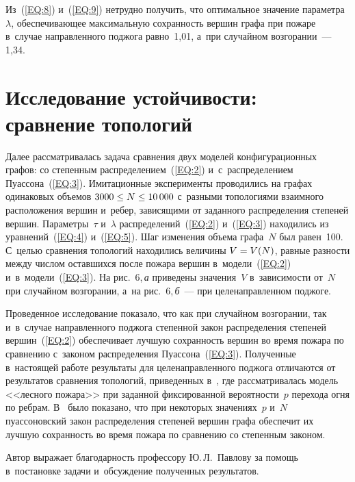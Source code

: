 \begin{multicols}{2}
Из~(\ref{EQ:8}) и~(\ref{EQ:9}) нетрудно получить, что оптимальное значение
параметра~$\lambda$, обеспечивающее максимальную сохранность вершин графа
при пожаре в~случае
направленного поджога равно~1,01, а~при случайном возгорании~--- 1,34.

\vspace*{-4pt}

\section{Исследование устойчивости: сравнение топологий}

\vspace*{-1pt}

Далее рассматривалась задача сравнения двух моделей конфигурационных графов:
со степенным распределением~(\ref{EQ:2}) и~с~распределением Пуассона~(\ref{EQ:3}).
Имитационные эксперименты проводились на графах одинаковых объемов
$3000\hm\leq N\hm\leq 10\,000$ с~разными топологиями взаимного расположения вершин
и~ре\-бер, зависящими от заданного распределения степеней вершин. Параметры~$\tau$
и~$\lambda$ распределений~(\ref{EQ:2}) и~(\ref{EQ:3}) находились из
уравнений~(\ref{EQ:4}) и~(\ref{EQ:5}). Шаг изменения
объема графа~$N$ был равен~100.
С~целью сравнения топологий находились величины $V \hm= V(N)$, равные разности
между чис\-лом оставшихся после пожара вершин в~модели~(\ref{EQ:2})
и~в~модели~(\ref{EQ:3}). На рис.~6,\,\textit{а} приведены значения~$V$ в~зависимости от~$N$
при случайном возгорании, а~на рис.~6,\,\textit{б}~--- при целенаправленном поджоге.




Проведенное исследование показало, что как при случайном возгорании, так и~в~случае
на\-прав\-лен\-но\-го поджога степенной закон распределения степеней вершин~(\ref{EQ:2})
обеспечивает лучшую сохранность вершин во время пожара по сравнению с~законом
распределения Пуассона~(\ref{EQ:3}). Полученные в~настоящей работе результаты
для целенаправленного поджога отличаются от результатов сравнения топологий,
приведенных в~\cite{Ler4}, где рассматривалась модель <<лесного пожара>> при заданной
фиксированной вероятности~$p$ перехода огня по реб\-рам. В~\cite{Ler4} было показано, что
при некоторых значениях~$p$ и~$N$ пуассоновский закон распределения степеней вершин графа
обеспечит их лучшую сохранность во время пожара по сравнению со степенным законом.

\smallskip

Автор выражает благодарность профессору Ю.\,Л.~Павлову за помощь в~постановке задачи
и~обсуждение полученных результатов.


\end{multicols}
